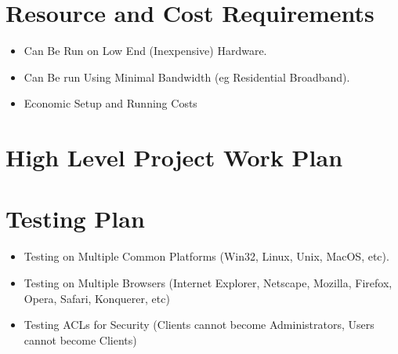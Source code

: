 \documentclass[a4paper,12pt]{article}
\begin{document}
\section{Resource and Cost Requirements}

\begin{itemize}

\item Can Be Run on Low End (Inexpensive) Hardware.

\item Can Be run Using Minimal Bandwidth (eg Residential Broadband).

\item Economic Setup and Running Costs 

\end{itemize}

\section{High Level Project Work Plan}

\newpage

\section{Testing Plan}

\begin{itemize}

\item Testing on Multiple Common Platforms (Win32, Linux, Unix, MacOS, etc).

\item Testing on Multiple Browsers (Internet Explorer, Netscape, Mozilla, Firefox, Opera, Safari, Konquerer, etc)

\item Testing ACLs for Security (Clients cannot become Administrators, Users cannot become Clients)

\end{itemize}
\end{document}
